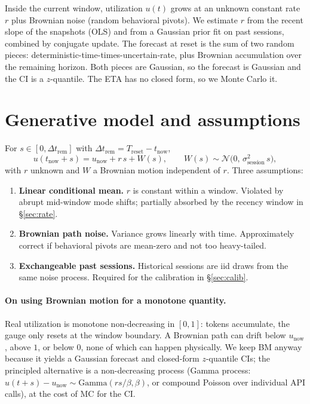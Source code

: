 \documentclass[11pt]{article}
\newcommand{\sigsessionsq}{\sigma_{\text{session}}^2}
\newcommand{\unow}{u_{\text{now}}}
\newcommand{\tnow}{t_{\text{now}}}
\newcommand{\Treset}{T_{\text{reset}}}
\newcommand{\Dtrem}{\Delta t_{\text{rem}}}
\begin{document}
Inside the current window, utilization $u(t)$ grows at an unknown constant
rate $r$ plus Brownian noise (random behavioral pivots). We estimate $r$ from
the recent slope of the snapshots (OLS) and from a Gaussian prior fit on
past sessions, combined by conjugate update. The forecast at reset is the
sum of two random pieces: deterministic-time-times-uncertain-rate, plus
Brownian accumulation over the remaining horizon. Both pieces are Gaussian,
so the forecast is Gaussian and the CI is a $z$-quantile. The ETA has no
closed form, so we Monte Carlo it.

\section{Generative model and assumptions}

For $s \in [0, \Dtrem]$ with $\Dtrem = \Treset - \tnow$,
\[
  u(\tnow + s) = \unow + r\,s + W(s),
  \qquad W(s) \sim \mathcal{N}\!\bigl(0,\, \sigsessionsq\,s\bigr),
\]
with $r$ unknown and $W$ a Brownian motion independent of $r$. Three
assumptions:

\begin{enumerate}
  \item \textbf{Linear conditional mean.} $r$ is constant within a window.
    Violated by abrupt mid-window mode shifts; partially absorbed by the
    recency window in \S\ref{sec:rate}.
  \item \textbf{Brownian path noise.} Variance grows linearly with time.
    Approximately correct if behavioral pivots are mean-zero and not too
    heavy-tailed.
  \item \textbf{Exchangeable past sessions.} Historical sessions are iid
    draws from the same noise process. Required for the calibration in
    \S\ref{sec:calib}.
\end{enumerate}

\paragraph{On using Brownian motion for a monotone quantity.} Real
utilization is monotone non-decreasing in $[0,1]$: tokens accumulate, the
gauge only resets at the window boundary. A Brownian path can drift below
$\unow$, above $1$, or below $0$, none of which can happen physically. We
keep BM anyway because it yields a Gaussian forecast and closed-form
$z$-quantile CIs; the principled alternative is a non-decreasing process
(Gamma process: $u(t+s) - \unow \sim \mathrm{Gamma}(rs/\beta,\beta)$, or
compound Poisson over individual API calls), at the cost of MC for the CI.
\end{document}
